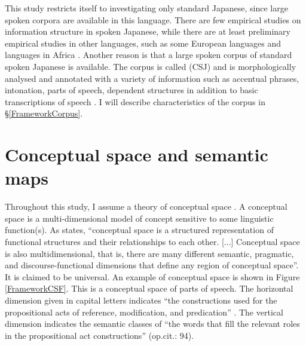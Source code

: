This study restricts itself to investigating only standard Japanese,
since large spoken corpora are available in this language.
There are few empirical studies on information structure in spoken Japanese,
while there are at least preliminary empirical studies in other languages, such as some European languages and languages in Africa \cite[e.g.,][]{cowles03,dipperetal04,dipperetal07,ritzetal08,skopeteasetal06,cookfildhauer11,chiarcosetal11}.
Another reason is that
a large spoken corpus of standard spoken Japanese is available.
The corpus is called  (CSJ) and 
is morphologically analysed and annotated with a variety of information such as accentual phrases, intonation, parts of speech, dependent structures in addition to basic transcriptions of speech \cite{maekawa03,maekawaetal04}.
I will describe characteristics of the corpus in \S \ref{FrameworkCorpus}.


\section{Conceptual space and semantic maps}\label{FrameworkSemanticMap}

Throughout this study,
I assume a theory of conceptual space \cite{croft01,haspelmath03}.
A conceptual space is a multi-dimensional model of concept sensitive to some linguistic function(s).
As  states,
``conceptual space is a structured representation of functional structures and their relationships to each other. [...] Conceptual space is also multidimensional, that is, there are many different semantic, pragmatic, and discourse-functional dimensions that define any region of conceptual space''.
It is claimed to be universal.
An example of conceptual space is shown in Figure \ref{FrameworkCSF}.
This is a conceptual space of parts of speech.
The horizontal dimension given in capital letters indicates
``the constructions used for the propositional acts of reference, modification, and predication'' \cite[][p.\ 93]{croft01}.
The vertical dimension indicates the semantic classes of ``the words that fill the relevant roles in the propositional act constructions''  (op.cit.: 94).

